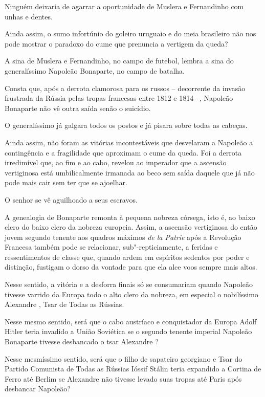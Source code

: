 Ninguém deixaria de agarrar a oportunidade de Muslera e Fernandinho com
unhas e dentes.

Ainda assim, o sumo infortúnio do goleiro uruguaio e do meia brasileiro
não nos pode mostrar o paradoxo do cume que prenuncia a vertigem da
queda?

A sina de Muslera e Fernandinho, no campo de futebol, lembra a sina do
generalíssimo Napoleão Bonaparte, no campo de batalha.

Consta que, após a derrota clamorosa para os russos -- decorrente da
invasão frustrada da Rússia pelas tropas francesas entre 1812 e 1814 --,
Napoleão Bonaparte não vê outra saída senão o suicídio.

O generalíssimo já galgara todos os postos e já pisara sobre todas as
cabeças.

Ainda assim, não foram as vitórias incontestáveis que desvelaram a
Napoleão a contingência e a fragilidade que aproximam o cume da queda.
Foi a derrota irredimível que, ao fim e ao cabo, revelou ao imperador
que a ascensão vertiginosa está umbilicalmente irmanada ao beco sem
saída daquele que já não pode mais cair sem ter que se ajoelhar.

O senhor se vê aguilhoado a seus escravos.

A genealogia de Bonaparte remonta à pequena nobreza córsega, isto é, ao
baixo clero do baixo clero da nobreza europeia. Assim, a ascensão
vertiginosa do então jovem segundo tenente aos quadros máximos \emph{de
la Patrie} após a Revolução Francesa também pode se relacionar,
sub"-repticiamente, a feridas e ressentimentos de classe que, quando
ardem em espíritos sedentos por poder e distinção, fustigam o dorso da
vontade para que ela alce voos sempre mais altos.

Nesse sentido, a vitória e a desforra finais só se consumariam quando
Napoleão tivesse varrido da Europa todo o alto clero da nobreza, em
especial o nobilíssimo Alexandre , Tsar de Todas as Rússias.

Nesse mesmo sentido, será que o cabo austríaco e conquistador da Europa
Adolf Hitler teria invadido a União Soviética se o segundo tenente
imperial Napoleão Bonaparte tivesse desbancado o tsar Alexandre ?

Nesse mesmíssimo sentido, será que o filho de sapateiro georgiano e Tsar
do Partido Comunista de Todas as Rússias Ióssif Stálin teria expandido a
Cortina de Ferro até Berlim se Alexandre  não tivesse levado suas
tropas até Paris após desbancar Napoleão?

